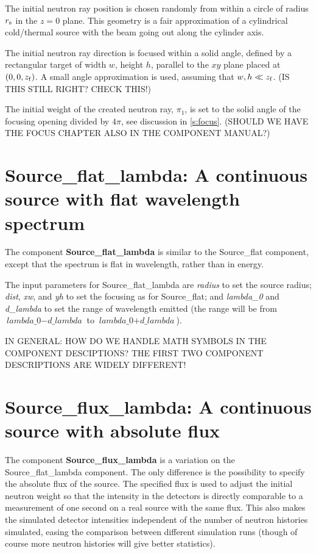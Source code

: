 The initial neutron ray position is chosen randomly from within a
circle of radius $r_{\rm s}$ in the $z=0$ plane. 
This geometry is a fair approximation
of a cylindrical cold/thermal source with the beam going out along
the cylinder axis.

The initial neutron ray direction is focused within
a solid angle, defined by a rectangular target of width
$w$, height $h$, parallel to 
the $xy$ plane placed at $(0,0,z_{\rm f})$. 
A small angle approximation is used, assuming that 
$w,h \ll z_{\rm f}$. (IS THIS STILL RIGHT? CHECK THIS!)

The initial weight of the created neutron ray, $\pi_1$, is set to the
solid angle of the focusing opening divided by $4\pi$,
see discussion in \ref{s:focus}. (SHOULD WE HAVE THE FOCUS CHAPTER ALSO
IN THE COMPONENT MANUAL?)


\section{Source\_flat\_lambda: A continuous source with flat
  wavelength spectrum}


The component {\bf Source\_flat\_lambda} is similar to the Source\_flat
component, except that the spectrum is flat in wavelength, rather
than in energy.

The input parameters for Source\_flat\_lambda are \textit{radius} to set
the source radius; \textit{dist}, \textit{xw}, and \textit{yh}
to set the focusing as for Source\_flat; and \textit{lambda\_0} and
\textit{d\_lambda} to set the range of wavelength emitted (the range
will be from $\textit{lambda\_0} - \textit{d\_lambda}$ to
$\textit{lambda\_0} + \textit{d\_lambda}$).

IN GENERAL: HOW DO WE HANDLE MATH SYMBOLS IN THE COMPONENT DESCIPTIONS? THE 
FIRST TWO COMPONENT DESCRIPTIONS ARE WIDELY DIFFERENT!

\section{Source\_flux\_lambda: A continuous source with absolute
  flux}
\label{Source_flux_lambda}

The component {\bf Source\_flux\_lambda} is a variation on the
Source\_flat\_lambda component. The only difference is the possibility
to specify the absolute flux of the source. The specified flux is used
to adjust the initial neutron weight so that the intensity in the
detectors is directly comparable to a measurement of one second on a
real source with the same flux. This also makes the simulated detector
intensities independent of the number of neutron histories simulated,
easing the comparison between different simulation runs (though of
course more neutron histories will give better statistics).

